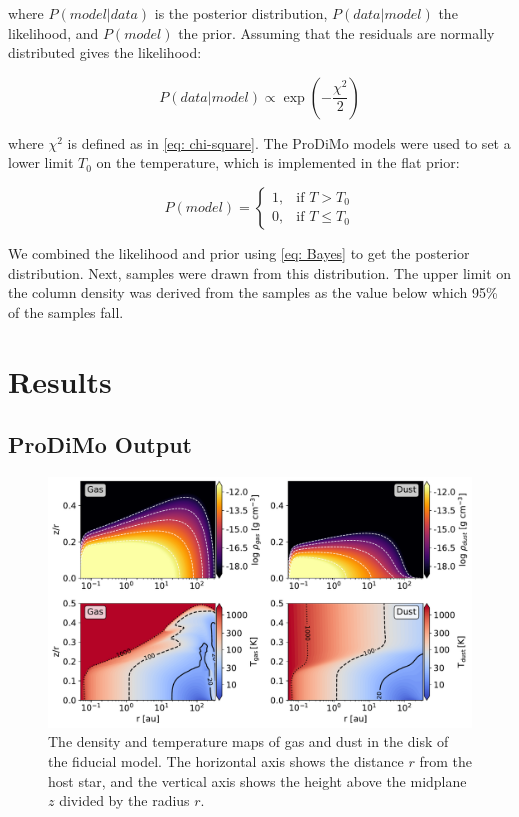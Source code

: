 \documentclass[twoside, single, authoryear, semicolon, 12pt]{lion-msc}
\newcommand{\4}{$_4$}
\newcommand{\3}{$_3$}
\newcommand{\2}{$_2$}
\begin{document}
where $P(model|data)$ is the posterior distribution, $P(data|model)$ the likelihood, and $P(model)$ the prior. Assuming that the residuals are normally distributed gives the likelihood:

\begin{equation}
    P(data|model)\propto\exp\left(-\frac{\chi^2}{2}\right)
\end{equation}

where $\chi^2$ is defined as in \autoref{eq: chi-square}. The ProDiMo models were used to set a lower limit $T_0$ on the temperature, which is implemented in the flat prior:

\begin{equation}
    P(model) = 
    \begin{cases}
        1, & \text{if } T > T_0 \\
        0, & \text{if } T \leq T_0
    \end{cases}
\end{equation}

We combined the likelihood and prior using \autoref{eq: Bayes} to get the posterior distribution. Next, samples were drawn from this distribution. The upper limit on the column density was derived from the samples as the value below which 95\% of the samples fall. 


\chapter{Results}\label{Ch: Results}
\section{ProDiMo Output}

\begin{figure}[H]
    \centering
    \includegraphics[width=\linewidth]{Figures/DensityTemperature.pdf}
    \caption{The density and temperature maps of gas and dust in the disk of the fiducial model. The horizontal axis shows the distance $r$ from the host star, and the vertical axis shows the height above the midplane $z$ divided by the radius $r$.}
    \label{fig: tempdensity}
\end{figure}
\end{document}
